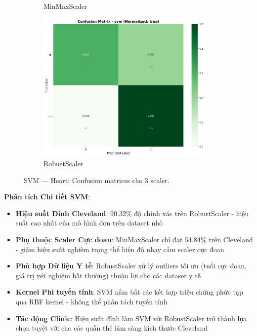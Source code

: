 \begin{figure}[H]
\begin{subfigure}[b]{0.31\textwidth}
\caption{MinMaxScaler}\label{fig:svm_heart_cm_minmax}
\end{subfigure}\hfill
\begin{subfigure}[b]{0.31\textwidth}\centering
\includegraphics[width=0.95\textwidth]{Result/heart_dataset/confusion_matrices/svm_numeric_dataset_RobustScaler.png}
\caption{RobustScaler}\label{fig:svm_heart_cm_robust}
\end{subfigure}
\caption{SVM — Heart: Confusion matrices cho 3 scaler.}
\label{fig:svm_heart_confusions}
\end{figure}

\textbf{Phân tích Chi tiết SVM}:
\begin{itemize}
    \item \textbf{Hiệu suất Đỉnh Cleveland}: 90.32\% độ chính xác trên RobustScaler - hiệu suất cao nhất của mô hình đơn trên dataset nhỏ
    \item \textbf{Phụ thuộc Scaler Cực đoan}: MinMaxScaler chỉ đạt 54.84\% trên Cleveland - giảm hiệu suất nghiêm trọng thể hiện độ nhạy cảm scaler cực đoan
    \item \textbf{Phù hợp Dữ liệu Y tế}: RobustScaler xử lý outliers tối ưu (tuổi cực đoan, giá trị xét nghiệm bất thường) thuận lợi cho các dataset y tế
    \item \textbf{Kernel Phi tuyến tính}: SVM nắm bắt các kết hợp triệu chứng phức tạp qua RBF kernel - không thể phân tách tuyến tính
    \item \textbf{Tác động Clinic}: Hiệu suất đỉnh làm SVM với RobustScaler trở thành lựa chọn tuyệt vời cho các quần thể lâm sàng kích thước Cleveland
\end{itemize}

